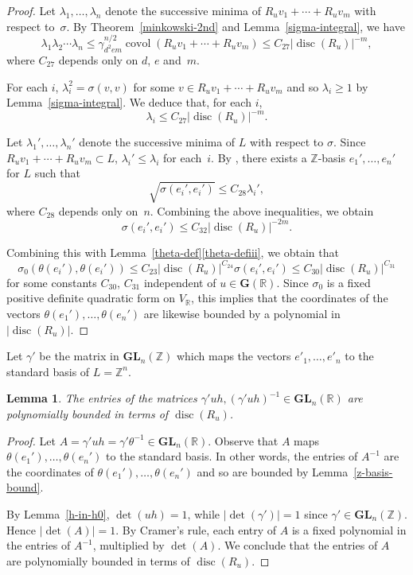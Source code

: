 \documentclass[JEP,XML,SOM,Unicode,NoFloatCountersInSection]{cedram}
\newcommand{\bR}{\mathbb{R}}
\newcommand{\bZ}{\mathbb{Z}}
\newcommand{\gG}{\mathbf{G}}
\newcommand{\gGL}{\mathbf{GL}}
\DeclareMathOperator{\covol}{covol}
\DeclareMathOperator{\disc}{disc}
\newcommand{\abs}[1]{\lvert #1 \rvert}
\newtheorem{lemma}{Lemma}[section]
\begin{document}
\begin{proof}
Let $\lambda_1, \dotsc, \lambda_n$ denote the successive minima of $R_u v_1 + \dotsb + R_u v_m$ with respect to~$\sigma$.
By Theorem~\ref{minkowski-2nd} and Lemma~\ref{sigma-integral}, we have
\[
\lambda_1 \lambda_2 \dotsm \lambda_n
\leq \gamma_{d^2em}^{n/2} \covol(R_u v_1 + \dotsb + R_u v_m)
\leq C_{27} \abs{\disc(R_u)}^{-m},
\]
where $C_{27}$ depends only on $d$, $e$ and~$m$.

For each $i$, $\lambda_i^2 = \sigma(v,v)$ for some $v \in R_u v_1 + \dotsb + R_u v_m$ and so $\lambda_i \geq 1$ by Lemma~\ref{sigma-integral}.
We deduce that, for each $i$,
\[
\lambda_i \leq C_{27} \abs{\disc(R_u)}^{-m}.
\]

Let $\lambda_1', \dotsc, \lambda_n'$ denote the successive minima of $L$ with respect to $\sigma$.
Since $R_u v_1 + \dotsb + R_u v_m \subset L$, $\lambda_i' \leq \lambda_i$ for each~$i$.
By \cite[Th.\,4]{Wey40}, there exists a $\bZ$-basis $e_1', \dotsc, e_n'$ for $L$ such that
\[
\sqrt{\sigma(e_i', e_i')} \leq C_{28} \lambda_i',
\]
where $C_{28}$ depends only on~$n$.
Combining the above inequalities, we obtain
\begin{equation*}
\sigma(e_i', e_i') \leq C_{32} \abs{\disc(R_u)}^{-2m}.
\end{equation*}

Combining this with Lemma~\ref{theta-def}\eqref{theta-defiii}, we obtain that
\[
\sigma_0(\theta(e_i'), \theta(e_i'))
\leq C_{23} \abs{\disc(R_u)}^{C_{24}} \sigma(e_i', e_i')
\leq C_{30} \abs{\disc(R_u)}^{C_{31}}
\]
for some constants $C_{30}$, $C_{31}$ independent of $u \in \gG(\bR)$.
Since $\sigma_0$ is a fixed positive definite quadratic form on $V_\bR$, this implies that the coordinates of the vectors $\theta(e_1'), \dotsc, \theta(e_n')$ are likewise bounded by a polynomial in $\abs{\disc(R_u)}$.
\end{proof}

Let $\gamma'$ be the matrix in $\gGL_n(\bZ)$ which maps the vectors $e'_1, \dotsc, e'_n$ to the standard basis of $L = \bZ^n$.

\begin{lemma} \label{entries'-bound}
The entries of the matrices $\gamma' uh, (\gamma' uh)^{-1} \in \gGL_n(\bR)$ are polynomially bounded in terms of $\disc(R_u)$.
\end{lemma}

\begin{proof}
Let $A = \gamma' uh = \gamma' \theta^{-1} \in \gGL_n(\bR)$.
Observe that $A$ maps $\theta(e_1'), \dotsc, \theta(e_n')$ to the standard basis.
In other words, the entries of $A^{-1}$ are the coordinates of $\theta(e_1'), \dotsc, \theta(e_n')$ and so are bounded by Lemma~\ref{z-basis-bound}.

By Lemma~\ref{h-in-h0}, $\det(uh)=1$, while $\abs{\det(\gamma')} = 1$ since $\gamma' \in \gGL_n(\bZ)$.
Hence $\abs{\det(A)}=1$.
By Cramer's rule, each entry of $A$ is a fixed polynomial in the entries of $A^{-1}$, multiplied by $\det(A)$.
We conclude that the entries of $A$ are polynomially bounded in terms of $\disc(R_u)$.
\end{proof}
\end{document}
